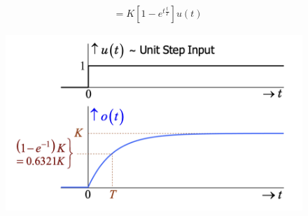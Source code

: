 \documentclass{article}
\begin{document}
\begin{enumerate}
\begin{align*}
         &= K[1-e^{t\frac{t}{T}}]u(t)
    \end{align*}
    \begin{figure}[h]
        \centering
        \includegraphics[width=0.75\linewidth]{9e19b7ea507f2d6e90b842d6f5b0fac.png}
    \end{figure}
\end{enumerate}
\end{document}
